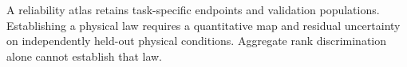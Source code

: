 A reliability atlas retains task-specific endpoints and validation populations. Establishing a physical law requires a quantitative map and residual uncertainty on independently held-out physical conditions. Aggregate rank discrimination alone cannot establish that law.
